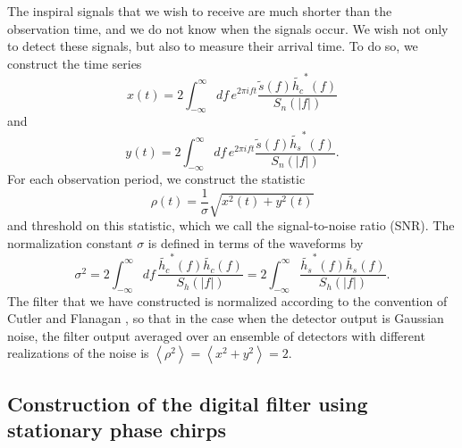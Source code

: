 The inspiral signals that we wish to receive are much shorter than the
observation time, and we do not know when the signals occur. We wish not only
to detect these signals, but also to measure their arrival time. To do so, we
construct the time series
\begin{equation}
\label{eq:xcts}
x(t) = 2 \int_{-\infty}^{\infty}df\,e^{2\pi i f t} 
\frac{\tilde{s}(f) \tilde{h_c}^\ast(f)}{S_n\left(\left|f\right|\right)}
\end{equation}
and
\begin{equation}
\label{eq:ycts}
y(t) = 2 \int_{-\infty}^{\infty}df\,e^{2\pi i f t} 
\frac{\tilde{s}(f) \tilde{h_s}^\ast(f)}{S_n\left(\left|f\right|\right)}.
\end{equation}
For each observation period, we construct the statistic
\begin{equation}
\rho(t) = \frac{1}{\sigma}\sqrt{x^2(t) + y^2(t)}
\label{eq:rhosqcts}
\end{equation}
and threshold on this statistic, which we call the signal-to-noise ratio
(SNR). The normalization constant $\sigma$ is defined in terms of the
waveforms by
\begin{equation}
\label{eq:sigmasqcts}
\sigma^2 = 2 \int_{-\infty}^{\infty}df\,
\frac{\tilde{h_c}^\ast(f)\tilde{h_c}(f)}{S_h\left(\left|f\right|\right)} 
= 2 \int_{-\infty}^\infty 
\frac{\tilde{h_s}^\ast(f)\tilde{h_s}(f)}{S_h\left(\left|f\right|\right)}.
\end{equation}
The filter that we have constructed is normalized according to the convention
of Cutler and Flanagan \cite{cutflan}, so that in the case when the detector
output is Gaussian noise, the filter output averaged over an ensemble of
detectors with different realizations of the noise is
$\left\langle \rho^2 \right\rangle = \left\langle x^2 + y^2 \right\rangle = 2$.

\subsection{Construction of the digital filter using stationary phase chirps}
\label{ss:digitalfilter}

